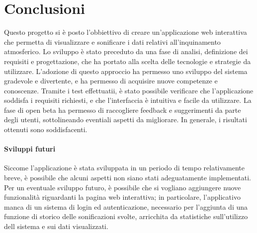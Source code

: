 \clearpage{\pagestyle{empty}\cleardoublepage}
\chapter*{Conclusioni}
Questo progetto si è posto l'obbiettivo di creare un'applicazione web interattiva che permetta di visualizzare e sonificare i dati relativi all'inquinamento atmosferico.
Lo sviluppo è stato preceduto da una fase di analisi, definizione dei requisiti e progettazione, che ha portato alla scelta delle tecnologie e strategie da utilizzare.
L'adozione di questo approccio ha permesso uno sviluppo del sistema gradevole e divertente, e ha permesso di acquisire nuove competenze e conoscenze.
Tramite i test effettuatii, è stato possibile verificare che l'applicazione soddisfa i requisiti richiesti, e che l'interfaccia è intuitiva e facile da utilizzare.
La fase di open beta ha permesso di raccogliere feedback e suggerimenti da parte degli utenti, sottolineando eventiali aspetti da migliorare.
In generale, i risultati ottenuti sono soddisfacenti.

\subsubsection{Sviluppi futuri}
Siccome l'applicazione è stata sviluppata in un periodo di tempo relativamente breve, è possibile che alcuni aspetti non siano stati adeguatamente implementati.
Per un eventuale sviluppo futuro, è possibile che si vogliano aggiungere nuove funzionalità riguardanti la pagina web interattiva; in particolare, l'applicativo manca di un sistema di login ed autenticazione,
necessario per l'aggiunta di una funzione di storico delle sonificazioni svolte, arricchita da statistiche sull'utilizzo dell sistema e sui dati visualizzati.

